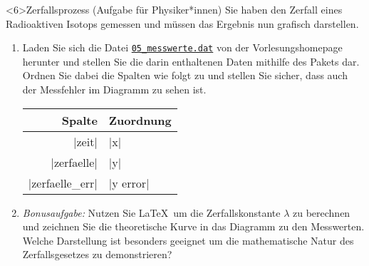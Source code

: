 \documentclass[
	vorläufig=false, 
	blattnr=5,
	ausgabe=2022-11-09,
	abgabe=2022-11-23,
	lösung=true,
	shortverb,
]{../tex/latexkurs-exercise}
\begin{document}


\begin{aufgabe}[6]<6>{Zerfallsprozess (Aufgabe für Physiker*innen)}
	Sie haben den Zerfall eines Radioaktiven Isotops gemessen und müssen das Ergebnis nun 
	grafisch darstellen. 
	\begin{enumerate}[label=\alph*)]
		\item Laden Sie sich die Datei 
		\href{http://latexkurs.github.io/exercises/05_messwerte.dat}{\texttt{05\_messwerte.dat}} von der
		Vorlesungshomepage herunter und stellen Sie die darin enthaltenen Daten mithilfe des Pakets
		 dar. Ordnen Sie dabei die Spalten wie folgt zu und stellen Sie sicher, dass auch der
		Messfehler im Diagramm zu sehen ist.
		\begin{center}
			\begin{tabular}{rl}
				\toprule
				\textbf{Spalte} & \textbf{Zuordnung}\\
				\midrule
				|zeit| & |x| \\
				|zerfaelle| & |y| \\
				|zerfaelle_err| & |y error|\\
				\bottomrule
			\end{tabular}
		\end{center}
		\item \emph{Bonusaufgabe:} Nutzen Sie \LaTeX\ um die Zerfallskonstante $\lambda$ zu berechnen und
		zeichnen Sie die theoretische Kurve in das Diagramm zu den Messwerten. Welche Darstellung ist
		besonders geeignet um die mathematische Natur des Zerfallsgesetzes zu demonstrieren?
	\end{enumerate}
\end{aufgabe}

\end{document}
